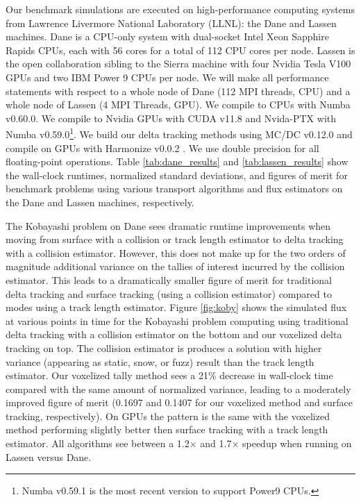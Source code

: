 Our benchmark simulations are executed on high-performance computing systems from Lawrence Livermore National Laboratory (LLNL): the Dane and Lassen machines.
Dane is a CPU-only system with dual-socket Intel Xeon Sapphire Rapids CPUs, each with 56 cores for a total of 112 CPU cores per node. 
Lassen is the open collaboration sibling to the Sierra machine with four Nvidia Tesla V100 GPUs and two IBM Power 9 CPUs per node.
We will make all performance statements with respect to a whole node of Dane (112 MPI threads, CPU) and a whole node of Lassen (4 MPI Threads, GPU).
We compile to CPUs with Numba v0.60.0.
We compile to Nvidia GPUs with CUDA v11.8 and Nvida-PTX with Numba v0.59.0\footnote{Numba v0.59.1 is the most recent version to support Power9 CPUs.}.
We build our delta tracking methods using MC/DC v0.12.0 \cite{transport_cement_mcdc_2024} and compile on GPUs with Harmonize v0.0.2 \cite{harmonize}.
We use double precision for all floating-point operations.
Table \ref{tab:dane_results} and \ref{tab:lassen_results} show the wall-clock runtimes, normalized standard deviations, and figures of merit for benchmark problems using various transport algorithms and flux estimators on the Dane and Lassen machines, respectively.

The Kobayashi problem on Dane sees dramatic runtime improvements when moving from surface with a collision or track length estimator to delta tracking with a collision estimator.
However, this does not make up for the two orders of magnitude additional variance on the tallies of interest incurred by the collision estimator.
This leads to a dramatically smaller figure of merit for traditional delta tracking and surface tracking (using a collision estimator) compared to modes using a track length estimator.
Figure \ref{fig:koby} shows the simulated flux at various points in time for the Kobayashi problem computing using traditional delta tracking with a collision estimator on the bottom and our voxelized delta tracking on top.
The collision estimator is produces a solution with higher variance (appearing as static, snow, or fuzz) result than the track length estimator.
Our voxelized tally method sees a 21\% decrease in wall-clock time compared with the same amount of normalized variance, leading to a moderately improved figure of merit (\num{0.1697} and \num{0.1407} for our voxelized method and surface tracking, respectively).
On GPUs the pattern is the same with the voxelized method performing slightly better then surface tracking with a track length estimator.
All algorithms see between a 1.2$\times$ and 1.7$\times$ speedup when running on Lassen versus Dane. 

